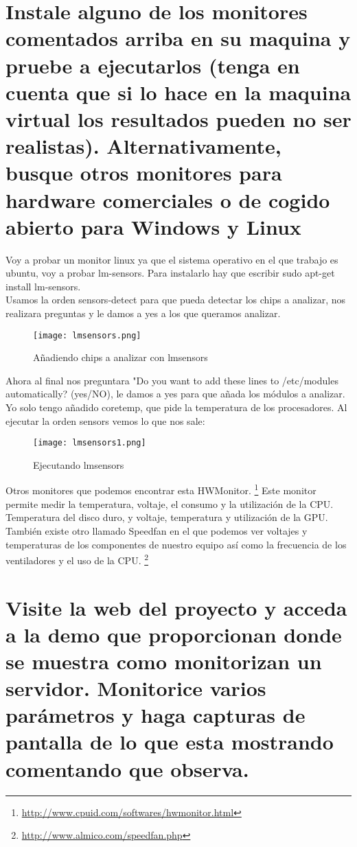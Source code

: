 \section{Instale alguno de los monitores comentados arriba en su maquina y pruebe a ejecutarlos (tenga en cuenta que si lo hace en la maquina virtual los resultados pueden no ser realistas). Alternativamente, busque otros monitores para hardware comerciales o de cogido abierto para Windows y Linux}
Voy a probar un monitor linux ya que el sistema operativo en el que trabajo es ubuntu, voy a probar lm-sensors.
Para instalarlo hay que escribir sudo apt-get install lm-sensors.
\\Usamos la orden sensors-detect para que pueda detectar los chips a analizar, nos realizara preguntas y le damos a yes a los que queramos analizar.
\begin{figure}[H] 
\centering
\texttt{[image: lmsensors.png]}  
\label{figura15:}
\caption{Añadiendo chips a analizar con lmsensors}
\end{figure}

Ahora al final nos preguntara "Do you want to add these lines to /etc/modules automatically? (yes/NO), le damos a yes para que añada los módulos a analizar.
\\Yo solo tengo añadido coretemp, que pide la temperatura de los procesadores.
Al ejecutar la orden sensors vemos lo que nos sale:
\begin{figure}[H] 
\centering
\texttt{[image: lmsensors1.png]}  
\label{figura16:}
\caption{Ejecutando lmsensors}
\end{figure}
Otros monitores que podemos encontrar esta HWMonitor. \footnote{\url{http://www.cpuid.com/softwares/hwmonitor.html}}
Este monitor permite medir la temperatura, voltaje, el consumo y la utilización de la CPU. Temperatura del disco duro, y voltaje, temperatura y utilización de la GPU.
También existe otro llamado Speedfan en el que podemos ver voltajes y temperaturas de los componentes de nuestro equipo así como la frecuencia de los ventiladores y el uso de la CPU. \footnote{\url{http://www.almico.com/speedfan.php}}
\section{Visite la web del proyecto y acceda a la demo que proporcionan donde se muestra como monitorizan un servidor. Monitorice varios parámetros y haga capturas de pantalla de lo que esta mostrando comentando que observa.}


